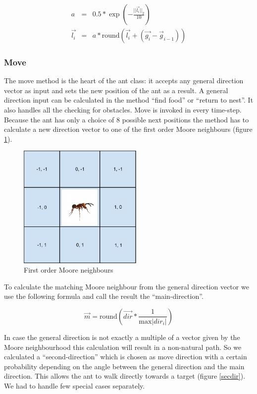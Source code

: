 \documentclass[11pt]{article}
\begin{document}
\begin{eqnarray}
a & = & 0.5 * \exp \left(-\frac{||\vec{l_i}||_2}{10}\right) \\
\vec{l_i} & = & a * \text{round} \left(\vec{l_i}  + \left(\vec{g_i} - {\vec{g}_{i-1}}\right)\right)
\end{eqnarray}

\subsubsection{Move}
The move method is the heart of the ant class: it accepts any general direction vector as input and sets the new position of the ant as a result. A general direction input can be calculated in the method “find food” or “return to nest”. It also handles all the checking for obstacles. Move is invoked in every time-step. Because the ant has only a choice of 8 possible next positions the method has to calculate a new direction vector to one of the first order Moore neighbours (figure \ref{moore}).
\begin{figure}
\centering
\includegraphics[width=6cm]{images/Mooreneighbours.pdf}
\caption[First order moore neighbours]{First order Moore neighbours\cite{soms,pic1}}
\label{moore}
\end{figure}

To calculate the matching Moore neighbour from the general direction vector we use the following formula and call the result the “main-direction”.

\begin{equation}
\vec{m} = \text{round}\left(\vec{dir}*\frac{1}{\text{max}|dir_i|}\right)
\end{equation}

In case the general direction is not exactly a multiple of a vector given by the Moore neighbourhood this calculation will result in a non-natural path. So we calculated a “second-direction” which is chosen as move direction with a certain probability depending on the angle between the general direction and the main direction. This allows the ant to walk directly towards a target (figure \ref{secdir}). We had to handle few special cases separately.
\end{document}
